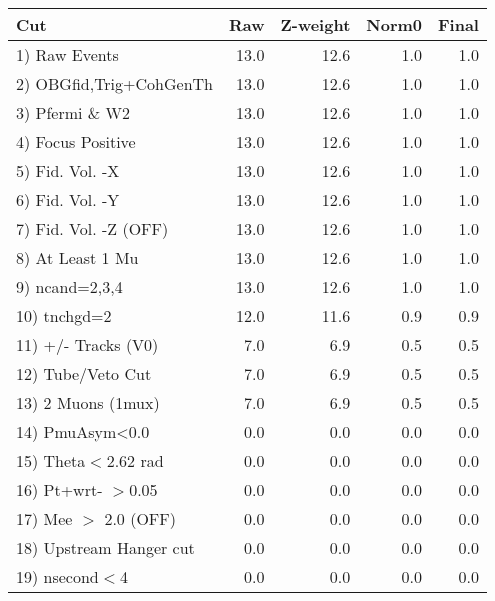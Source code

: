  \begin{table}[h!]\centering
 \begin{tabular}{||l||r|r|r|r||}
 \hline
 \hline
 Cut & Raw & Z-weight & Norm0 & Final \\
 \hline
  1) Raw Events           &        13.0 &        12.6 &         1.0 &         1.0 \\
  2) OBGfid,Trig+CohGenTh &        13.0 &        12.6 &         1.0 &         1.0 \\
  3) Pfermi \& W2         &        13.0 &        12.6 &         1.0 &         1.0 \\
  4) Focus Positive       &        13.0 &        12.6 &         1.0 &         1.0 \\
  5) Fid. Vol. -X         &        13.0 &        12.6 &         1.0 &         1.0 \\
  6) Fid. Vol. -Y         &        13.0 &        12.6 &         1.0 &         1.0 \\
  7) Fid. Vol. -Z (OFF)   &        13.0 &        12.6 &         1.0 &         1.0 \\
  8) At Least 1 Mu        &        13.0 &        12.6 &         1.0 &         1.0 \\
  9) ncand=2,3,4          &        13.0 &        12.6 &         1.0 &         1.0 \\
 10) tnchgd=2             &        12.0 &        11.6 &         0.9 &         0.9 \\
 11) +/- Tracks (V0)      &         7.0 &         6.9 &         0.5 &         0.5 \\
 12) Tube/Veto Cut        &         7.0 &         6.9 &         0.5 &         0.5 \\
 13) 2 Muons (1mux)       &         7.0 &         6.9 &         0.5 &         0.5 \\
 14) PmuAsym<0.0          &         0.0 &         0.0 &         0.0 &         0.0 \\
 15) Theta$<$2.62 rad     &         0.0 &         0.0 &         0.0 &         0.0 \\
 16) Pt+wrt- $>$0.05      &         0.0 &         0.0 &         0.0 &         0.0 \\
 17) Mee $>$ 2.0  (OFF)   &         0.0 &         0.0 &         0.0 &         0.0 \\
 18) Upstream Hanger cut  &         0.0 &         0.0 &         0.0 &         0.0 \\
 19) nsecond$<$4          &         0.0 &         0.0 &         0.0 &         0.0 \\

\end{tabular}
\end{table}
